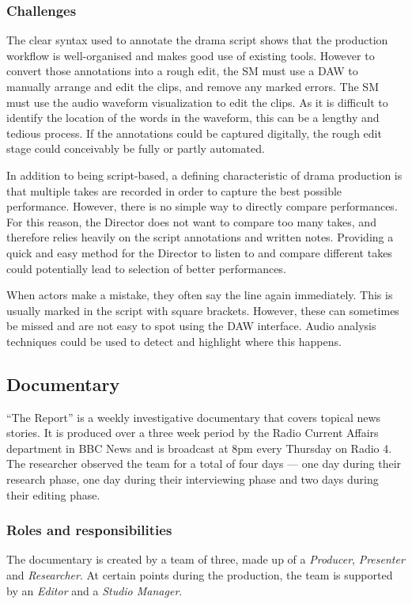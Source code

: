 \subsubsection{Challenges}
The clear syntax used to annotate the drama script shows that the production workflow is well-organised and makes good
use of existing tools. However to convert those annotations into a rough edit, the SM must use a DAW to manually
arrange and edit the clips, and remove any marked errors. The SM must use the audio waveform visualization to edit the
clips.  As it is difficult to identify the location of the words in the waveform, this can be a lengthy and tedious
process. If the annotations could be captured digitally, the rough edit stage could conceivably be fully or partly
automated.

In addition to being script-based, a defining characteristic of drama production is that multiple takes are recorded in
order to capture the best possible performance. However, there is no simple way to directly compare performances. For
this reason, the Director does not want to compare too many takes, and therefore relies heavily on the script
annotations and written notes. Providing a quick and easy method for the Director to listen to and compare different
takes could potentially lead to selection of better performances.

When actors make a mistake, they often say the line again immediately. This is usually marked in the script with square
brackets. However, these can sometimes be missed and are not easy to spot using the DAW interface.  Audio analysis
techniques could be used to detect and highlight where this happens.


\subsection{Documentary}\label{sec:doc}
``The Report'' is a weekly investigative documentary that covers topical news stories. It is produced over a three week
period by the Radio Current Affairs department in BBC News and is broadcast at 8pm every Thursday on Radio 4. The
researcher observed the team for a total of four days --- one day during their research phase, one day during their
interviewing phase and two days during their editing phase.

\subsubsection{Roles and responsibilities}
The documentary is created by a team of three, made up of a \textit{Producer}, \textit{Presenter} and
\textit{Researcher}.  At certain points during the production, the team is supported by an \textit{Editor} and
a \textit{Studio Manager}.

